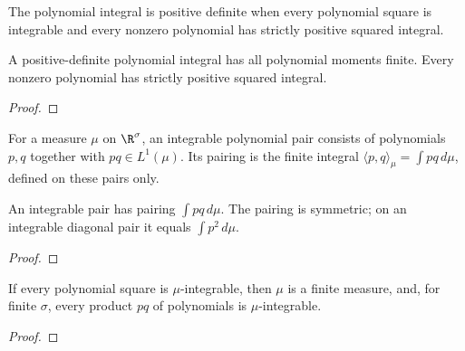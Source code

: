 \begin{definition}
\label{def:multivariate-positive}
\leanok
The polynomial integral is positive definite when every polynomial square
is integrable and every nonzero polynomial has strictly positive squared integral.
\end{definition}

\begin{supporting}
\begin{theorem}
\label{thm:multivariate-positive-characterisation}
\leanok
A positive-definite polynomial integral has all polynomial moments finite.
Every nonzero polynomial has strictly positive squared integral.
\end{theorem}
\begin{proof}
\leanok
\end{proof}

\begin{definition}
\label{def:multivariate-integrable-pair}
\leanok
For a measure $\mu$ on $\R^\sigma$, an integrable polynomial pair consists of
polynomials $p,q$ together with $pq\in L^1(\mu)$. Its pairing is the finite
integral $\langle p,q\rangle_\mu=\int pq\,d\mu$, defined on these pairs only.
\end{definition}

\begin{theorem}
\label{thm:multivariate-integrable-pair}
\leanok
An integrable pair has pairing $\int pq\,d\mu$. The pairing is symmetric;
on an integrable diagonal pair it equals $\int p^2\,d\mu$.
\end{theorem}
\begin{proof}
\leanok
\end{proof}

\begin{theorem}
\label{thm:multivariate-moments-basic}
\leanok
If every polynomial square is $\mu$-integrable, then $\mu$ is a finite measure,
and, for finite $\sigma$, every product $pq$ of polynomials is
$\mu$-integrable.
\end{theorem}
\begin{proof}
\leanok
\end{proof}


\end{supporting}
